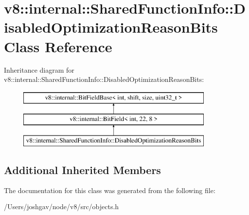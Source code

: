 \hypertarget{classv8_1_1internal_1_1_shared_function_info_1_1_disabled_optimization_reason_bits}{}\section{v8\+:\+:internal\+:\+:Shared\+Function\+Info\+:\+:Disabled\+Optimization\+Reason\+Bits Class Reference}
\label{classv8_1_1internal_1_1_shared_function_info_1_1_disabled_optimization_reason_bits}
Inheritance diagram for v8\+:\+:internal\+:\+:Shared\+Function\+Info\+:\+:Disabled\+Optimization\+Reason\+Bits\+:\begin{figure}[H]
\begin{center}
\leavevmode
\includegraphics[height=3.000000cm]{classv8_1_1internal_1_1_shared_function_info_1_1_disabled_optimization_reason_bits}
\end{center}
\end{figure}
\subsection*{Additional Inherited Members}


The documentation for this class was generated from the following file\+:\begin{DoxyCompactItemize}
\item 
/\+Users/joshgav/node/v8/src/objects.\+h\end{DoxyCompactItemize}
